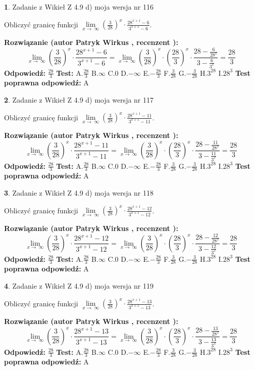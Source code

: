 \documentclass[12pt, a4paper]{article}
\theoremstyle{definition} %
\newtheorem{zad}{}
\newcommand{\zadStart}[1]{\begin{zad}#1\newline}
\newcommand{\zadStop}{\end{zad}}
\newcommand{\rozwStart}[2]{\noindent \textbf{Rozwiązanie (autor #1 , recenzent #2): }\newline}
\newcommand{\rozwStop}{\newline}
\newcommand{\odpStart}{\noindent \textbf{Odpowiedź:}\newline}
\newcommand{\odpStop}{\newline}
\newcommand{\testStart}{\noindent \textbf{Test:}\newline}
\newcommand{\testStop}{\newline}
\newcommand{\kluczStart}{\noindent \textbf{Test poprawna odpowiedź:}\newline}
\newcommand{\kluczStop}{\newline}
\begin{document}
\zadStart{Zadanie z Wikieł Z 4.9 d) moja wersja nr 116}


Obliczyć granicę funkcji  $\lim\limits_{x\to\ \infty}(\frac{3}{28})^{x}\cdot\frac{28^{x+1}-6}{3^{x+1}-6}$.
\zadStop
\rozwStart{Patryk Wirkus}{}
$$\lim\limits_{x\to\ \infty}(\frac{3}{28})^{x}\cdot\frac{28^{x+1}-6}{3^{x+1}-6}=\lim\limits_{x\to\ \infty}(\frac{3}{28})^{x}\cdot(\frac{28}{3})^{x} \cdot \frac{28-\frac{6}{28^{x}}}{3-\frac{6}{3^{x}}} = \frac{28}{3}$$
\rozwStop
\odpStart
$\frac{28}{3}$
\odpStop
\testStart
A.$\frac{28}{3}$ B.$\infty$ C.$0$ D.$-\infty$ E.$-\frac{28}{3}$
F.$\frac{3}{28}$ G.$-\frac{3}{28}$
H.$3^{28}$
I.$28^{3}$
\testStop
\kluczStart
A
\kluczStop



\zadStart{Zadanie z Wikieł Z 4.9 d) moja wersja nr 117}


Obliczyć granicę funkcji  $\lim\limits_{x\to\ \infty}(\frac{3}{28})^{x}\cdot\frac{28^{x+1}-11}{3^{x+1}-11}$.
\zadStop
\rozwStart{Patryk Wirkus}{}
$$\lim\limits_{x\to\ \infty}(\frac{3}{28})^{x}\cdot\frac{28^{x+1}-11}{3^{x+1}-11}=\lim\limits_{x\to\ \infty}(\frac{3}{28})^{x}\cdot(\frac{28}{3})^{x} \cdot \frac{28-\frac{11}{28^{x}}}{3-\frac{11}{3^{x}}} = \frac{28}{3}$$
\rozwStop
\odpStart
$\frac{28}{3}$
\odpStop
\testStart
A.$\frac{28}{3}$ B.$\infty$ C.$0$ D.$-\infty$ E.$-\frac{28}{3}$
F.$\frac{3}{28}$ G.$-\frac{3}{28}$
H.$3^{28}$
I.$28^{3}$
\testStop
\kluczStart
A
\kluczStop



\zadStart{Zadanie z Wikieł Z 4.9 d) moja wersja nr 118}


Obliczyć granicę funkcji  $\lim\limits_{x\to\ \infty}(\frac{3}{28})^{x}\cdot\frac{28^{x+1}-12}{3^{x+1}-12}$.
\zadStop
\rozwStart{Patryk Wirkus}{}
$$\lim\limits_{x\to\ \infty}(\frac{3}{28})^{x}\cdot\frac{28^{x+1}-12}{3^{x+1}-12}=\lim\limits_{x\to\ \infty}(\frac{3}{28})^{x}\cdot(\frac{28}{3})^{x} \cdot \frac{28-\frac{12}{28^{x}}}{3-\frac{12}{3^{x}}} = \frac{28}{3}$$
\rozwStop
\odpStart
$\frac{28}{3}$
\odpStop
\testStart
A.$\frac{28}{3}$ B.$\infty$ C.$0$ D.$-\infty$ E.$-\frac{28}{3}$
F.$\frac{3}{28}$ G.$-\frac{3}{28}$
H.$3^{28}$
I.$28^{3}$
\testStop
\kluczStart
A
\kluczStop



\zadStart{Zadanie z Wikieł Z 4.9 d) moja wersja nr 119}


Obliczyć granicę funkcji  $\lim\limits_{x\to\ \infty}(\frac{3}{28})^{x}\cdot\frac{28^{x+1}-13}{3^{x+1}-13}$.
\zadStop
\rozwStart{Patryk Wirkus}{}
$$\lim\limits_{x\to\ \infty}(\frac{3}{28})^{x}\cdot\frac{28^{x+1}-13}{3^{x+1}-13}=\lim\limits_{x\to\ \infty}(\frac{3}{28})^{x}\cdot(\frac{28}{3})^{x} \cdot \frac{28-\frac{13}{28^{x}}}{3-\frac{13}{3^{x}}} = \frac{28}{3}$$
\rozwStop
\odpStart
$\frac{28}{3}$
\odpStop
\testStart
A.$\frac{28}{3}$ B.$\infty$ C.$0$ D.$-\infty$ E.$-\frac{28}{3}$
F.$\frac{3}{28}$ G.$-\frac{3}{28}$
H.$3^{28}$
I.$28^{3}$
\testStop
\kluczStart
A
\kluczStop
\end{document}

